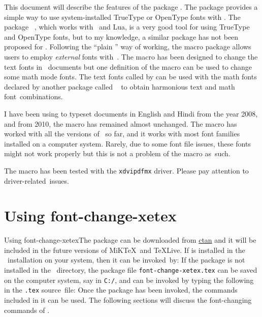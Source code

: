 {This document will describe the features of the package . The package provides a simple way to use system-installed TrueType or OpenType fonts with \capsxetex. The package ~\cite{fontspec_package}, which works with \capsxelatex\ and Lua\capstex, is a very good tool for using TrueType and OpenType fonts, but to my knowledge, a similar package has not been proposed for \capsxetex. Following the ``plain \capstex'' way of working, the macro package  allows users to employ {\it external} fonts with~\capsxetex. The macro has been designed to change the text fonts in \capsxetex\ documents but one definition of the macro can be used to change some math mode fonts. The text fonts called by  can be used with the math fonts declared by another package called ~\cite{font-change_package} to obtain harmonious text and math font~combinations.

I have been using  to typeset documents in English and Hindi from the year 2008, and from 2010, the macro has remained almost unchanged. The macro has worked with all the versions of \capsxetex\ so far, and it works with most font families installed on a computer system. Rarely, due to some font file issues, these fonts might not work properly but this is not a problem of the macro as~such.

The macro  has been tested with the {\tt xdvipdfmx} driver. Please pay attention to driver-related~issues.


\section{Using font-change-xetex}{Using font-change-xetex}The package  can be downloaded from \href{http://www.ctan.org}{\caps ctan} and it will be included in the future versions of MiK\TeX\ and \TeX Live. If  is installed in the \capstex\ installation on your system, then it can be invoked~by:
\ms
{}
\ms
\ii If the package is not installed in the \capstex\ directory, the package file {\tt font-change-xetex.tex} can be saved on the computer system, say in {\tt C:/}, and can be invoked by typing the following in the {\tt .tex} source~file:
\ms
{}
\bs
Once the package has been invoked, the commands included in it can be used. The following sections will discuss the font-changing commands of .


}
